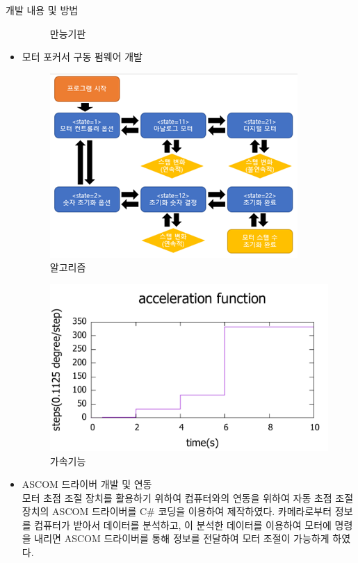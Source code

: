 \documentclass{gshs_poster_beamer}
\begin{document}
\begin{columns}[T]
\begin{posterbox}[colbacktitle=blue!50!black,coltitle=white,colback=cyan!5]{개발 내용 및 방법}
\begin{itemize}
\begin{figure}[h]
		\caption{만능기판}
		\label{fig:circuit1}
	\end{figure}
	\item 모터 포커서 구동 펌웨어 개발\\
	\begin{figure}[h]
		\centering
		\includegraphics[scale=0.8]{algorithm}
		\caption{알고리즘}
		\label{fig:algorithm}
	\end{figure}
	\begin{figure}[h]
		\centering
		\includegraphics[scale=0.5]{function}
		\caption{가속기능}
		\label{fig:function}
	\end{figure}
	\item ASCOM 드라이버 개발 및 연동\\
	모터 초점 조절 장치를 활용하기 위하여 컴퓨터와의 연동을 위하여 자동 초점 조절 장치의 ASCOM 드라이버를 C\# 코딩을 이용하여 제작하였다. 카메라로부터 정보를 컴퓨터가 받아서 데이터를 분석하고, 이 분석한 데이터를 이용하여 모터에 명령을 내리면 ASCOM 드라이버를 통해 정보를 전달하여 모터 조절이 가능하게 하였다.
  \end{itemize}
\end{posterbox}


\end{columns}
\end{document}
